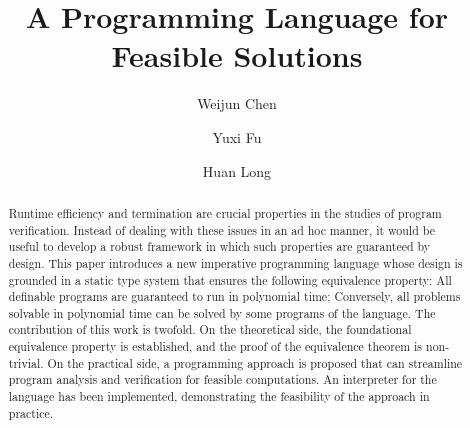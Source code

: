 \documentclass[runningheads]{llncs}
\begin{document}
%
\title{A Programming Language for Feasible Solutions}
%
%
\author{Weijun Chen \and
Yuxi Fu{\Envelope} \and Huan Long
}
%
%
%
\maketitle              %
%
\begin{abstract}
Runtime efficiency and termination are crucial properties in the studies of program verification.
Instead of dealing with these issues in an ad hoc manner, it would be useful to develop a robust framework in which such properties are guaranteed by design.
This paper introduces a new imperative programming language whose design is grounded in a static type system that ensures the following equivalence property:
All definable programs are guaranteed to run in polynomial time; Conversely, all problems solvable in polynomial time can be solved by some programs of the language.
The contribution of this work is twofold.
On the theoretical side, the foundational equivalence property is established, and the proof of the equivalence theorem is non-trivial.
On the practical side, a programming approach is proposed that can streamline program analysis and verification for feasible computations.
An interpreter for the language has been implemented, demonstrating the feasibility of the approach in practice.

\end{abstract}
%
%
%
%
\def\classP{\mathbf{P}}
\def\classFP{\mathbf{FP}}
\def\classPC{\mathbf{FPC}}
\def\classL{\mathscr{L}}
\def\classE{\mathscr{E}}
\def\classB{\mathbf B}
\def\classPH{\mathbf{PH}}
\def\classBFF{\mathbf{BFF}_2}
\def\N{\mathbb{N}}
\def\size#1{\vert#1\vert}
\def\typeInt{\mathtt{int}}
\def\typeBool{\mathtt{bool}}
\end{document}
